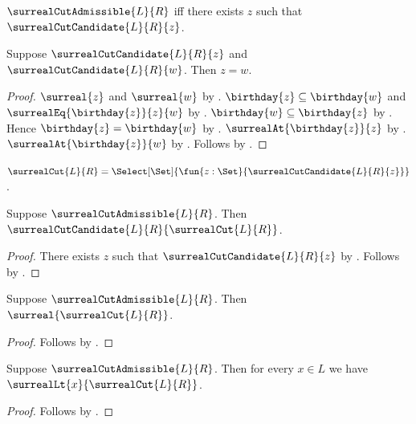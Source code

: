 \begin{definition}\label{surreal_cut_admissible}
    $\surrealCutAdmissible{L}{R}$ iff
        there exists $z$ such that $\surrealCutCandidate{L}{R}{z}$.
\end{definition}

\begin{proposition}\label{surreal_cut_candidate_unique}
    Suppose $\surrealCutCandidate{L}{R}{z}$ and
        $\surrealCutCandidate{L}{R}{w}$.
    Then $z=w$.
\end{proposition}
\begin{proof}
    $\surreal{z}$ and $\surreal{w}$
        by .
    $\birthday{z}\subseteq\birthday{w}$ and
        $\surrealEq{\birthday{z}}{z}{w}$
        by .
    $\birthday{w}\subseteq\birthday{z}$
        by .
    Hence $\birthday{z}=\birthday{w}$
        by .
    $\surrealAt{\birthday{z}}{z}$
        by .
    $\surrealAt{\birthday{z}}{w}$
        by .
    Follows by .
\end{proof}

\begin{definition}\label{surreal_cut}
    $\surrealCut{L}{R}=
        \Select[\Set]{\fun{z:\Set}{\surrealCutCandidate{L}{R}{z}}}$.
\end{definition}

\begin{theorem}\label{surreal_cut_specification}
    Suppose $\surrealCutAdmissible{L}{R}$.
    Then $\surrealCutCandidate{L}{R}{\surrealCut{L}{R}}$.
\end{theorem}
\begin{proof}
    There exists $z$ such that $\surrealCutCandidate{L}{R}{z}$
        by .
    Follows by .
\end{proof}

\begin{corollary}\label{surreal_cut_is_surreal}
    Suppose $\surrealCutAdmissible{L}{R}$.
    Then $\surreal{\surrealCut{L}{R}}$.
\end{corollary}
\begin{proof}
    Follows by
        .
\end{proof}

\begin{corollary}\label{surreal_cut_left}
    Suppose $\surrealCutAdmissible{L}{R}$.
    Then for every $x\in L$ we have
        $\surrealLt{x}{\surrealCut{L}{R}}$.
\end{corollary}
\begin{proof}
    Follows by
        .
\end{proof}


